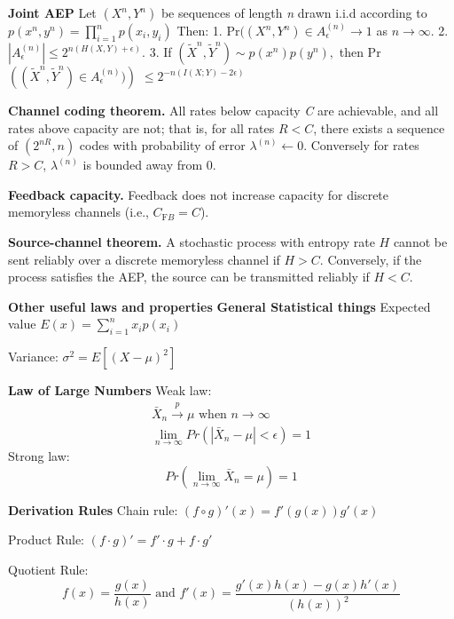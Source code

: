 \documentclass[10pt]{article}
\begin{document}
\begin{tiny}
\begin{multicols}{3}
{\bf Joint AEP} Let $(X^{n}, Y^{n})$ be sequences of length {\it n} drawn i.i.d according to $p(x^{n},y^{n})=\prod_{i=1}^{n}p(x_{i},y_{i})$ Then: 1. Pr$((X^{n},Y^{n}) \in A_{\epsilon}^{(n)}\rightarrow 1$ as $n\rightarrow \infty$. 2. $|A_{\epsilon}^{(n)}|\leq 2^{n(H(X,Y)+\epsilon)}$. 3. If $(\tilde{X}^{n}, \tilde{Y}^{n})\sim p(x^{n})p(y^{n}),$ then Pr$\left( (\tilde{X}^{n},\tilde{Y}^{n})\in A_{\epsilon}^{(n)} )\right) $ $\leq 2^{-n(I(X;Y)-2\epsilon)}$

{\bf Channel coding theorem.} All rates below capacity {\it C} are achievable, and all rates above capacity are not; that is, for all rates $R<C$, there exists a sequence of $(2^{nR},n)$ codes with probability of error $\lambda^{(n)}\leftarrow 0$. Conversely for rates $R>C$, $\lambda^{(n)}$ is bounded away from 0.

{\bf Feedback capacity.} Feedback does not increase capacity for discrete memoryless channels (i.e., $C_{\text{F}B} = C$).

{\bf Source-channel theorem.} A stochastic process with entropy rate $H$ cannot be sent reliably over a discrete memoryless channel if $H > C$. Conversely, if the process satisfies the AEP, the source can be transmitted reliably if $H<C$.



\textbf{\scriptsize Other useful laws and properties}
{\bf General Statistical things} Expected value $E(x)=\sum_{i=1}^n x_i p(x_i)$

Variance: $\sigma^2 = E\left[ \left(X-\mu\right)^2\right]$

{\bf Law of Large Numbers} Weak law:
\begin{eqnarray*}
\bar{X}_n\overset{p}\rightarrow \mu \text{ when } n \rightarrow \infty\\
\lim_{n\rightarrow \infty} Pr\left(|\bar{X}_n-\mu| < \epsilon \right) = 1
\end{eqnarray*}
Strong law:
\begin{equation}
Pr\left(\lim_{n\rightarrow \infty} \bar{X}_n = \mu \right) = 1
\end{equation}

{\bf Derivation Rules} Chain rule: $(f \circ g)'(x)=f'(g(x))g'(x)$

Product Rule: $(f\cdot g)' = f' \cdot g + f \cdot g'$

Quotient Rule: \[f(x)=\frac{g(x)}{h(x)}\text{ and }f'(x)=\frac{g'(x)h(x)-g(x)h'(x)}{\left(h(x)\right)^2}\]



\end{multicols}
\end{tiny}
\end{document}
